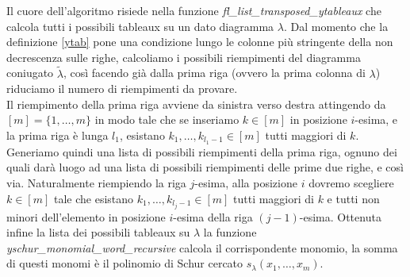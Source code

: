 Il cuore dell'algoritmo risiede nella funzione
\emph{fl\_list\_transposed\_ytableaux} che calcola tutti i
possibili tableaux su un dato diagramma $\lambda$. Dal momento che la
definizione \ref{ytab} pone una condizione
lungo le colonne pi\`u stringente della non decrescenza sulle
righe, calcoliamo i possibili riempimenti del diagramma coniugato
$\tilde{\lambda}$, cos\`i facendo gi\`a dalla prima riga (ovvero la
prima colonna di $\lambda$) riduciamo il numero di riempimenti da
provare.\\
Il riempimento della prima riga avviene da sinistra verso destra
attingendo da $[m]=\{1,\ldots, m\}$ in modo tale che se inseriamo $k \in
[m]$ in posizione $i$-esima, e la prima riga \`e lunga $l_1$, esistano
$k_1,\ldots,k_{l_1-1} \in [m]$ tutti maggiori di $k$. Generiamo quindi
una lista di possibili riempimenti della prima riga, ognuno dei quali
dar\`a luogo ad una lista di possibili riempimenti delle prime due
righe, e cos\`i via.
Naturalmente riempiendo la riga $j$-esima, alla
posizione $i$ dovremo scegliere $k \in [m]$ tale che esistano
$k_1,\ldots,k_{l_j-1} \in [m]$ tutti maggiori di $k$ e tutti non
minori dell'elemento in posizione $i$-esima della riga
$(j-1)$-esima.
Ottenuta infine la lista dei possibili tableaux su $\lambda$ la
funzione \emph{yschur\_monomial\_word\_recursive} calcola il
corrispondente monomio, la somma di questi monomi \`e il polinomio di
Schur cercato $s_\lambda(x_1,\ldots,x_m)$.


